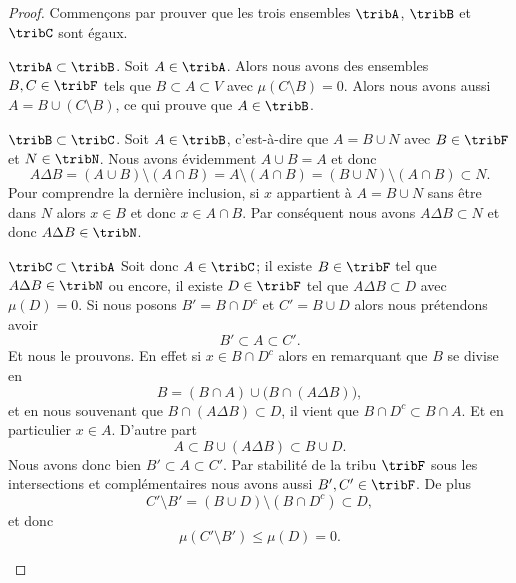 \begin{proof}
    Commençons par prouver que les trois ensembles \( \tribA\), \( \tribB\) et \( \tribC\) sont égaux.
    \begin{subproof}
    \item[\( \tribA\subset\tribB\).]
        Soit \( A\in\tribA\). Alors nous avons des ensembles \( B,C\in\tribF \) tels que \( B\subset A\subset V\) avec \( \mu(C\setminus B)=0\). Alors nous avons aussi \( A=B\cup(C\setminus B)\), ce qui prouve que \( A\in\tribB\).
    \item[\( \tribB\subset\tribC\).]
        Soit \( A\in\tribB\), c'est-à-dire que \( A=B\cup N\) avec \( B\in\tribF\) et \( N\in\tribN\). Nous avons évidemment \( A\cup B=A\) et donc
        \begin{equation}
            A\Delta B=(A\cup B)\setminus(A\cap B)=A\setminus(A\cap B)=(B\cup N)\setminus(A\cap B)\subset N.
        \end{equation}
        Pour comprendre la dernière inclusion, si \( x\) appartient à \( A=B\cup N\) sans être dans \( N\) alors \( x\in B\) et donc \( x\in A\cap B\). Par conséquent nous avons \( A\Delta B\subset N\) et donc \( A\Delta B\in\tribN\).
    \item[\( \tribC\subset\tribA\)]
        Soit donc \( A\in\tribC\); il existe \( B\in\tribF\) tel que \( A\Delta B\in\tribN\) ou encore, il existe \( D\in\tribF\) tel que \( A\Delta B\subset D\) avec \( \mu(D)=0\). Si nous posons \( B'=B\cap D^c\) et \( C'=B\cup D\) alors nous prétendons avoir
        \begin{equation}
            B'\subset A\subset C'.
        \end{equation}
        Et nous le prouvons. En effet si \( x\in B\cap D^c\) alors en remarquant que \( B\) se divise en
        \begin{equation}
            B=(B\cap A)\cup\big(B\cap (A\Delta B)\big),
        \end{equation}
        et en nous souvenant que \( B\cap (A\Delta B)\subset D\), il vient que \( B\cap D^c\subset B\cap A\). Et en particulier \( x\in A\). D'autre part
        \begin{equation}
            A\subset B\cup(A\Delta B)\subset B\cup D.
        \end{equation}
        Nous avons donc bien \( B'\subset A\subset C'\). Par stabilité de la tribu \( \tribF\) sous les intersections et complémentaires nous avons aussi \( B',C'\in\tribF\). De plus
        \begin{equation}
            C'\setminus B'=(B\cup D)\setminus(B\cap D^c)\subset D,
        \end{equation}
         et donc
         \begin{equation}
             \mu(C'\setminus B')\leq \mu(D)=0.
         \end{equation}
    \end{subproof}


\end{proof}
